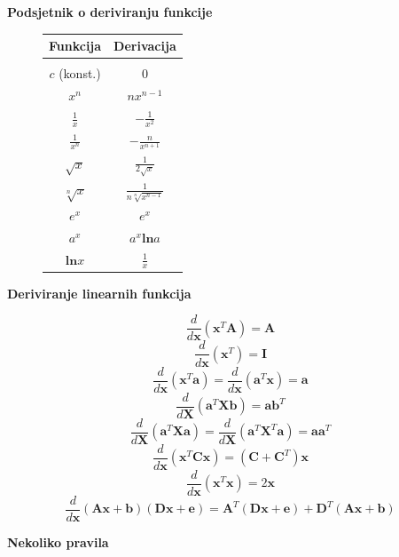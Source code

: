 \documentclass{book}
\begin{document}
\begin{shaded}
\textbf{Podsjetnik o deriviranju funkcije} \\




\begin{figure}[H]



\centering

\begin{tabular}{c|c}
\textbf{Funkcija} & \textbf{Derivacija} \\
\hline \\
$c$ (konst.) & 0 \\
$x^n$ & $nx^{n-1}$ \\
$\frac{1}{x}$ & $-\frac{1}{x^2}$ \\
$\frac{1}{x^n}$ & $-\frac{n}{x^{n+1}}$ \\
$\sqrt{x}$ & $\frac{1}{2\sqrt{x}}$ \\
$\sqrt[n]{x}$  & $\frac{1}{n\sqrt[n]{x^{n-1}}}$ \\
$e^x$ & $e^x$ \\
$a^x$ & $a^x\mathbf{ln}a$ \\
$\mathbf{ln}x$ & $\frac{1}{x}$ \\
\end{tabular}
 


\end{figure}


\textbf{Deriviranje linearnih funkcija}

\begin{center}
$$ \frac{d}{d\mathbf{x}}(\mathbf{x}^T\mathbf{A})= \mathbf{A} $$
$$ \frac{d}{d\mathbf{x}}(\mathbf{x}^T) = \mathbf{I} $$
$$ \frac{d}{d\mathbf{x}}(\mathbf{x}^T\mathbf{a})=
\frac{d}{d\mathbf{x}}(\mathbf{a}^T\mathbf{x}) = \mathbf{a}$$
$$ \frac{d}{d\mathbf{X}}(\mathbf{a}^T\mathbf{X}\mathbf{b}) =
\mathbf{a}\mathbf{b}^T $$
$$ \frac{d}{d\mathbf{X}}(\mathbf{a}^T\mathbf{X}\mathbf{a}) =
\frac{d}{d\mathbf{X}}(\mathbf{a}^T\mathbf{X}^T\mathbf{a}) =
\mathbf{a}\mathbf{a}^T $$
$$ \frac{d}{d\mathbf{x}}(\mathbf{x}^T\mathbf{C}\mathbf{x}) = (\mathbf{C} +
\mathbf{C}^T)\mathbf{x} $$
$$ \frac{d}{d\mathbf{x}}(\mathbf{x}^T\mathbf{x}) = 2\mathbf{x}$$
$$ \frac{d}{d\mathbf{x}}(\mathbf{A}\mathbf{x} +
\mathbf{b})(\mathbf{D}\mathbf{x} + \mathbf{e}) =
\mathbf{A}^T(\mathbf{D}\mathbf{x} + \mathbf{e}) + \mathbf{D}^T(\mathbf{A}\mathbf{x} +
\mathbf{b}) $$
\end{center}


\textbf{Nekoliko pravila}






\end{shaded}
\end{document}
